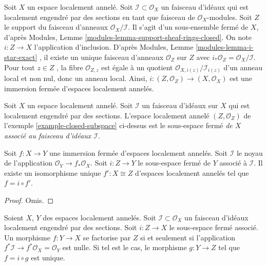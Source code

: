 \begin{example}
\label{example-closed-subspace}
Soit  $X$  un espace localement annelé. Soit  $\mathcal{I} \subset \mathcal{O}_X$  un faisceau
d'idéaux qui est localement engendré par des sections en tant que faisceau de
 $\mathcal{O}_X$-modules. Soit  $Z$  le support du faisceau d'anneaux
 $\mathcal{O}_X/\mathcal{I}$. Il s'agit d'un sous-ensemble fermé de  $X$, d'après Modules,
Lemme  \ref{modules-lemma-support-sheaf-rings-closed}. On note  $i : Z \to X$  l'application d'inclusion. D'après
Modules, Lemme  \ref{modules-lemma-i-star-exact} , il existe un unique faisceau d'anneaux  $\mathcal{O}_Z$ 
sur  $Z$  avec  $i_*\mathcal{O}_Z = \mathcal{O}_X/\mathcal{I}$. Pour tout  $z \in Z$ , la fibre  $\mathcal{O}_{Z, z}$ 
est égale à un quotient  $\mathcal{O}_{X, i(z)}/\mathcal{I}_{i(z)}$  d'un anneau local et non nul, donc un anneau
local. Ainsi,  $i : (Z, \mathcal{O}_Z) \to (X, \mathcal{O}_X)$  est une immersion fermée d'espaces localement annelés.
\end{example}

\begin{definition}
\label{definition-closed-subspace}
Soit  $X$  un espace localement annelé. Soit  $\mathcal{I}$  un faisceau
d'idéaux sur  $X$  qui est localement engendré par des sections. L'espace
localement annelé  $(Z, \mathcal{O}_Z)$  de l'exemple  \ref{example-closed-subspace}  ci-dessus est le sous-espace
fermé  {\it  de  $X$  associé au faisceau d'idéaux
 $\mathcal{I}$}.
\end{definition}

\begin{lemma}
\label{lemma-closed-immersion}
Soit  $f : X \to Y$  une immersion fermée d'espaces localement annelés. Soit
 $\mathcal{I}$  le noyau de l'application  $\mathcal{O}_Y \to f_*\mathcal{O}_X$. Soit  $i : Z \to Y$  le sous-espace
fermé de  $Y$  associé à  $\mathcal{I}$. Il existe un isomorphisme unique
 $f' : X \cong Z$  d'espaces localement annelés tel que  $f = i \circ f'$.
\end{lemma}

\begin{proof}
Omis.
\end{proof}

\begin{lemma}
\label{lemma-characterize-closed-subspace}
Soient  $X$,  $Y$  des espaces localement annelés. Soit
 $\mathcal{I} \subset \mathcal{O}_X$  un faisceau d'idéaux localement engendré par des sections. Soit
 $i : Z \to X$  le sous-espace fermé associé. Un morphisme  $f : Y \to X$  se factorise
par  $Z$  si et seulement si l'application  $f^*\mathcal{I} \to f^*\mathcal{O}_X = \mathcal{O}_Y$  est nulle. Si tel
est le cas, le morphisme  $g : Y \to Z$  tel que  $f = i \circ g$  est unique.
\end{lemma}

